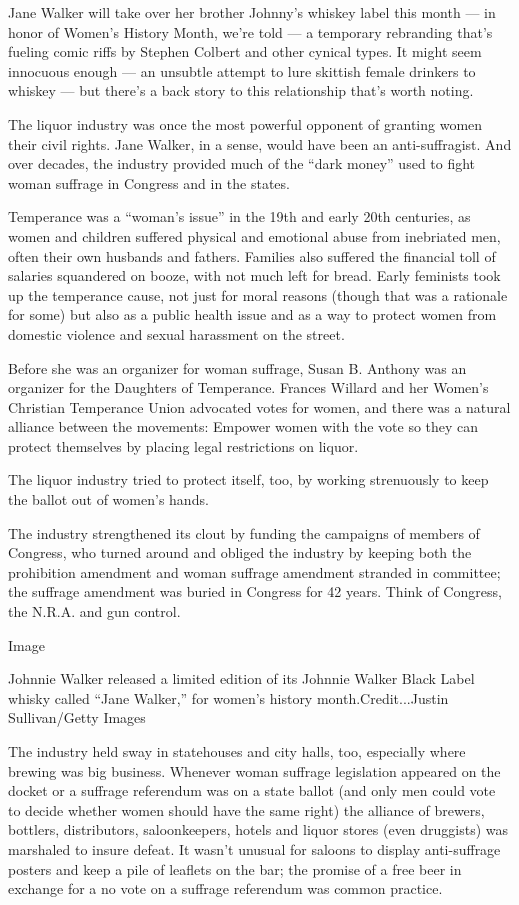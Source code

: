 Jane Walker will take over her brother Johnny's whiskey label this month
--- in honor of Women's History Month, we're told --- a temporary
rebranding that's fueling comic riffs by Stephen Colbert and other
cynical types. It might seem innocuous enough --- an unsubtle attempt to
lure skittish female drinkers to whiskey --- but there's a back story to
this relationship that's worth noting.

The liquor industry was once the most powerful opponent of granting
women their civil rights. Jane Walker, in a sense, would have been an
anti-suffragist. And over decades, the industry provided much of the
``dark money'' used to fight woman suffrage in Congress and in the
states.

Temperance was a ``woman's issue'' in the 19th and early 20th centuries,
as women and children suffered physical and emotional abuse from
inebriated men, often their own husbands and fathers. Families also
suffered the financial toll of salaries squandered on booze, with not
much left for bread. Early feminists took up the temperance cause, not
just for moral reasons (though that was a rationale for some) but also
as a public health issue and as a way to protect women from domestic
violence and sexual harassment on the street.

Before she was an organizer for woman suffrage, Susan B. Anthony was an
organizer for the Daughters of Temperance. Frances Willard and her
Women's Christian Temperance Union advocated votes for women, and there
was a natural alliance between the movements: Empower women with the
vote so they can protect themselves by placing legal restrictions on
liquor.

The liquor industry tried to protect itself, too, by working strenuously
to keep the ballot out of women's hands.

The industry strengthened its clout by funding the campaigns of members
of Congress, who turned around and obliged the industry by keeping both
the prohibition amendment and woman suffrage amendment stranded in
committee; the suffrage amendment was buried in Congress for 42 years.
Think of Congress, the N.R.A. and gun control.

Image

Johnnie Walker released a limited edition of its Johnnie Walker Black
Label whisky called ``Jane Walker,'' for women's history
month.Credit...Justin Sullivan/Getty Images

The industry held sway in statehouses and city halls, too, especially
where brewing was big business. Whenever woman suffrage legislation
appeared on the docket or a suffrage referendum was on a state ballot
(and only men could vote to decide whether women should have the same
right) the alliance of brewers, bottlers, distributors, saloonkeepers,
hotels and liquor stores (even druggists) was marshaled to insure
defeat. It wasn't unusual for saloons to display anti-suffrage posters
and keep a pile of leaflets on the bar; the promise of a free beer in
exchange for a no vote on a suffrage referendum was common practice.


